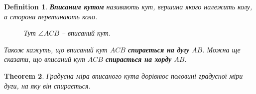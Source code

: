 \documentclass[a4paper, 10pt]{article}
\theoremstyle{theoremdd}
\newtheorem{theorem}{Theorem}[subsection]
\theoremstyle{theoremdd}
\theoremstyle{theoremdd}
\newtheorem{definition}[theorem]{Definition}
\theoremstyle{theoremdd}
\theoremstyle{theoremdd}
\theoremstyle{theoremdd}
\theoremstyle{theoremdd}
\theoremstyle{theoremdd}
\theoremstyle{theoremdd}
\begin{document}
\begin{definition}
\textbf{Вписаним кутом} називають кут, вершина якого належить колу, а сторони перетинають коло.
\begin{figure}[H]
\centering
{}
\caption*{Тут $\angle ACB$ -- вписаний кут.}
\end{figure}
Також кажуть, що вписаний кут $ACB$ \textbf{спирається на дугу} $AB$. Можна ще сказати, що вписаний кут $ACB$ \textbf{спирається на хорду} $AB$.
\end{definition}

\begin{theorem}
Градусна міра вписаного кута дорівнює половині градусної міри дуги, на яку він спирається.
\end{theorem}
\end{document}
